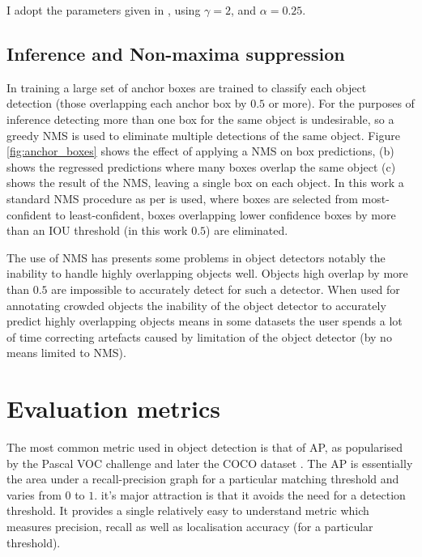 I adopt the parameters given in \cite{Lin2017}, using $ \gamma = 2 $, and $ \alpha = 0.25 $.

\subsection{Inference and Non-maxima suppression}

In training a large set of anchor boxes are trained to classify each object detection (those overlapping each anchor box by $0.5$ or more). For the purposes of inference detecting more than one box for the same object is undesirable, so a greedy \gls{NMS} is used to eliminate multiple detections of the same object. Figure \ref{fig:anchor_boxes} shows the effect of applying a \gls{NMS} on box predictions, (b) shows the regressed predictions where many boxes overlap the same object (c) shows the result of the \gls{NMS}, leaving a single box on each object. In this work a standard \gls{NMS} procedure as per \cite{Wang2017} is used, where boxes are selected from most-confident to least-confident, boxes overlapping lower confidence boxes by more than an \gls{IOU} threshold (in this work $0.5$) are eliminated.

The use of \gls{NMS} has presents some problems in object detectors notably the inability to handle highly overlapping objects well. Objects high overlap by more than $0.5$ are impossible to accurately detect for such a detector. When used for annotating crowded objects the inability of the object detector to accurately predict highly overlapping objects means in some datasets the user spends a lot of time correcting artefacts caused by limitation of the object detector (by no means limited to \gls{NMS}).


\section{Evaluation metrics}
\label{sec:evaluation_metrics}

The most common metric used in object detection is that of \gls{AP}, as popularised by the Pascal VOC challenge \cite{Everingham2008} and later the COCO dataset \cite{Lin2014}. The \gls{AP} is essentially the area under a recall-precision graph for a particular matching threshold and varies from $0$  to $1$. it's major attraction is that it avoids the need for a detection threshold. It provides a single relatively easy to understand metric which measures precision, recall as well as localisation accuracy (for a particular threshold).

